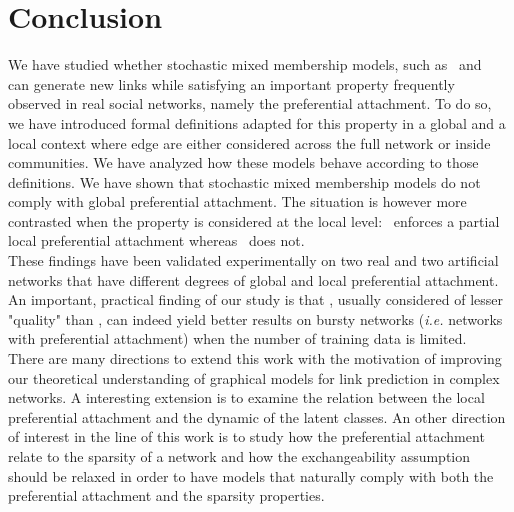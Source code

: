 
\section{Conclusion}
\label{sec:concl}

We have studied whether stochastic mixed membership models, such as \ifm\ and \imb\, can generate new links while satisfying an important property frequently observed in real social networks, namely the preferential attachment. To do so, we have introduced formal definitions adapted for this property in a global and a local context where edge are either considered across the full network or inside communities. We have analyzed how these models behave according to those definitions. We  have shown that stochastic mixed membership models do not comply with global preferential attachment. The situation is however more contrasted when the property is considered at the local level: \imb\ enforces a partial local preferential attachment whereas \ifm\ does not.~\\

These findings have been validated experimentally on two real and two artificial networks that have different degrees of global and local preferential attachment. An important, practical finding of our study is that \imb, usually considered of lesser "quality" than \ifm, can indeed yield better results on bursty networks (\textit{i.e.} networks with preferential attachment) when the number of training data is limited.~\\

There are many directions to extend this work with the motivation of improving our theoretical understanding of graphical models for link prediction in complex networks. A interesting extension is to examine the relation between the local preferential attachment and the dynamic of the latent classes.
An other direction of interest in the line of this work is to study how the preferential attachment relate to the sparsity of a network and how the exchangeability assumption should be relaxed in order to have models that naturally comply with both the preferential attachment and the sparsity properties.



